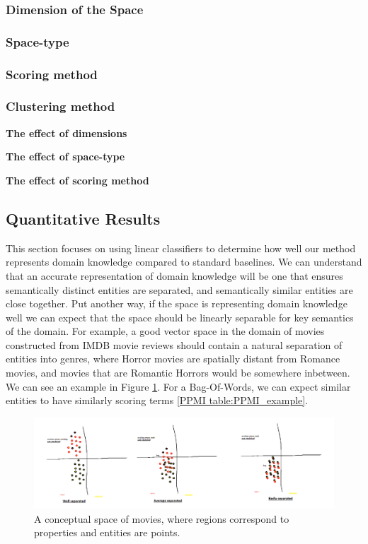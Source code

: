 \subsubsection{Dimension of the Space}

\subsubsection{Space-type}

\subsubsection{Scoring method}

\subsubsection{Clustering method}

\textbf{The effect of dimensions}


\textbf{The effect of space-type}


\textbf{The effect of scoring method}

\subsection{Quantitative Results}

This section focuses on using linear classifiers to determine how well our method represents domain knowledge compared to standard baselines. We can understand that an accurate representation of domain knowledge will be one that ensures semantically distinct entities are separated, and semantically similar entities are close together. Put another way, if the space is representing domain knowledge well we can expect that the space should be linearly separable for key semantics of the domain. For example, a good vector space in the domain of movies constructed from IMDB movie reviews should contain a natural separation of entities into genres, where Horror movies are spatially distant from Romance movies, and movies that are Romantic Horrors would be somewhere inbetween. We can see an example in Figure \ref{figure:genres_separated}. For a Bag-Of-Words, we can expect similar entities to have similarly scoring terms \ref{PPMI table:PPMI_example}.

\begin{figure}[t]
	\includegraphics[width=\textwidth]{images/genres_separated.png}
	\centering
	\caption{A conceptual space of movies, where regions correspond to properties and entities are points.}\label{figure:genres_separated}
\end{figure}

